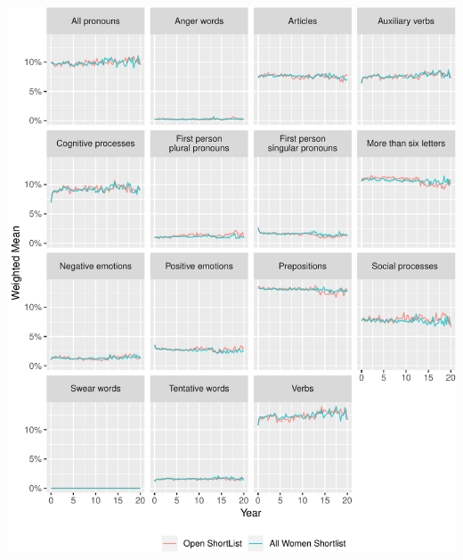 \documentclass[]{article}
\let\origfigure\figure
\let\endorigfigure\endfigure
\renewenvironment{figure}[1][2] {
    \expandafter\origfigure\expandafter[H]
} {
    \endorigfigure
}
\theoremstyle{definition}
\theoremstyle{definition}
\theoremstyle{definition}
\theoremstyle{remark}
\begin{document}
\begin{figure}
\centering
\includegraphics{methodology_files/figure-latex/sl-key-y-since-start-1.pdf}
\caption{\label{fig:sl-key-y-since-start}Occurrence of selected LIWC terms,
by time as MP}
\end{figure}
\end{document}
